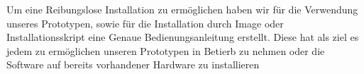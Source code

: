 Um eine Reibungslose Installation zu ermöglichen haben wir für die Verwendung unseres Prototypen, sowie für die Installation durch Image oder Installationsskript eine Genaue Bedienungsanleitung erstellt. Diese hat als ziel es jedem zu ermöglichen unseren Prototypen in Betierb zu nehmen oder die Software auf bereits vorhandener Hardware zu installieren